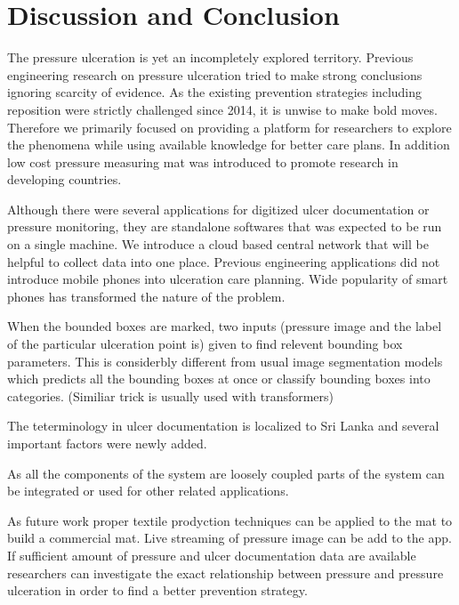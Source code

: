 \chapter{Discussion and Conclusion}

The pressure ulceration is yet an incompletely explored territory. Previous engineering research on pressure ulceration tried to make strong conclusions ignoring scarcity of evidence. As the existing prevention strategies including reposition were strictly challenged since 2014, it is unwise to make bold moves. Therefore we primarily focused on providing a platform for researchers to explore the phenomena while using available knowledge for better care plans. In addition low cost pressure measuring mat was introduced to promote research in developing countries. 

Although there were several applications for digitized ulcer documentation or pressure monitoring, they are standalone softwares that was expected to be run on a single machine. We introduce a cloud based central network that will be helpful to collect data into one place. Previous engineering applications did not introduce mobile phones into ulceration care planning. Wide popularity of smart phones has transformed the nature of the problem. 

When the bounded boxes are marked, two inputs (pressure image and the label of the particular ulceration point is) given to find relevent bounding box parameters. This is considerbly different from usual image segmentation models which predicts all the bounding boxes at once or classify bounding boxes into categories. (Similiar trick is usually used with transformers) 

The teterminology in ulcer documentation is localized to Sri Lanka and several important factors were newly added.

As all the components of the system are loosely coupled parts of the system can be integrated or used for other related applications.

As future work proper textile prodyction techniques can be applied to the mat to build a commercial mat. Live streaming of pressure image can be add to the app. If sufficient amount of pressure and ulcer documentation data are available researchers can investigate the exact relationship between pressure and pressure ulceration in order to find a better prevention strategy.


